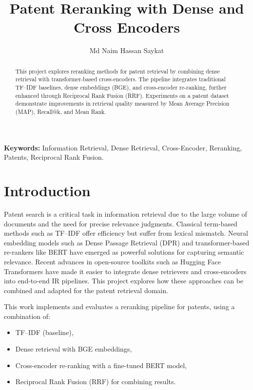 \documentclass[11pt,a4paper]{article}
\title{\textbf{Patent Reranking with Dense and Cross Encoders}}
\author{Md Naim Hassan Saykat}
\date{}
\begin{document}
\maketitle

\begin{abstract}
This project explores reranking methods for patent retrieval by combining dense retrieval with transformer-based cross-encoders. The pipeline integrates traditional TF--IDF baselines, dense embeddings (BGE), and cross-encoder re-ranking, further enhanced through Reciprocal Rank Fusion (RRF). Experiments on a patent dataset demonstrate improvements in retrieval quality measured by Mean Average Precision (MAP), Recall@k, and Mean Rank.
\end{abstract}

\noindent \textbf{Keywords:} Information Retrieval, Dense Retrieval, Cross-Encoder, Reranking, Patents, Reciprocal Rank Fusion.

\section{Introduction}
Patent search is a critical task in information retrieval due to the large volume of documents and the need for precise relevance judgments. 
Classical term-based methods such as TF--IDF offer efficiency but suffer from lexical mismatch. 
Neural embedding models such as Dense Passage Retrieval (DPR) \cite{lin2020dpr} and transformer-based re-rankers like BERT \cite{nogueira2019passage} have emerged as powerful solutions for capturing semantic relevance. 
Recent advances in open-source toolkits such as Hugging Face Transformers \cite{wolf2020transformers} have made it easier to integrate dense retrievers and cross-encoders into end-to-end IR pipelines. 
This project explores how these approaches can be combined and adapted for the patent retrieval domain.

This work implements and evaluates a reranking pipeline for patents, using a combination of:
\begin{itemize}
    \item TF--IDF (baseline),
    \item Dense retrieval with BGE embeddings,
    \item Cross-encoder re-ranking with a fine-tuned BERT model,
    \item Reciprocal Rank Fusion (RRF) for combining results.
\end{itemize}

\end{document}
